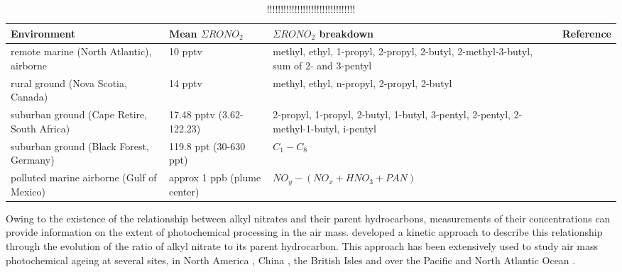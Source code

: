 \documentclass[11pt,a4paper]{article}
\begin{document}
\renewcommand{\arraystretch}{1}
\begin{table}[h!]
\caption{!!!!!!!!!!!!!!!!!!!!!!!!!!!!!!!!}\label{tab:ANmean} %
\begin{tabularx}{\linewidth}{P{3cm}P{2cm}P{5cm}X}
\hline
Environment     & Mean $\Sigma RONO_2$ & $\Sigma RONO_2$ breakdown & Reference \\
\hline
remote marine (North Atlantic), airborne   & 10 pptv    & methyl, ethyl, 1-propyl, 2-propyl, 2-butyl, 2-methyl-3-butyl, sum of 2- and 3-pentyl  & \citep{Reeves2007} \\
\hline
rural ground (Nova Scotia, Canada)        & 14 pptv    & methyl, ethyl, n-propyl, 2-propyl, 2-butyl  & \citep{Roberts1998} \\
\hline
suburban ground (Cape Retire, South Africa)  & 17.48 pptv (3.62-122.23) & 2-propyl, 1-propyl, 2-butyl, 1-butyl, 3-pentyl, 2-pentyl, 2-methyl-1-butyl, i-pentyl & \citep{DeKock1994} \\
\hline
suburban ground (Black Forest, Germany)    & 119.8 ppt (30-630 ppt) & $C_1-C_8$ & \citep{Flocke1998} \\
\hline
polluted marine airborne (Gulf of Mexico) & approx 1 ppb (plume center)& $NO_y-(NO_x+HNO_3+PAN)$ & \citep{Neuman2012} \\
\hline
\end{tabularx}
\end{table}

Owing to the existence of the relationship between alkyl nitrates and their parent hydrocarbons, measurements of their concentrations can provide information on the extent of photochemical processing in the air mass. \cite{Bertman1995} developed a kinetic approach to describe this relationship through the evolution of the ratio of alkyl nitrate to its parent hydrocarbon. This approach has been extensively used to study air mass photochemical ageing at several sites, in North America \citep{Bertman1995,Roberts1998}, China \citep{Simpson2006}, the British Isles \citep{Worton2010} and over the Pacific \citep{Simpson2003} and North Atlantic Ocean \citep{Reeves2007,Stroud2001}.
\end{document}
